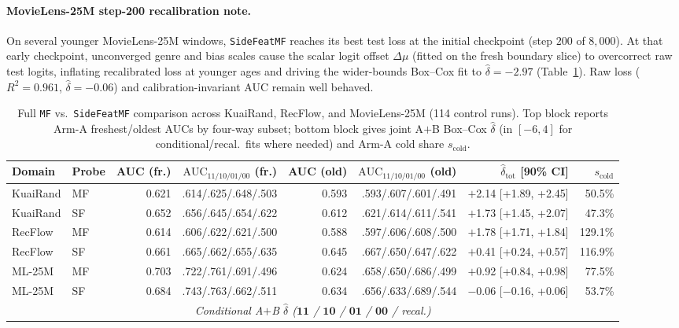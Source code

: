\documentclass[10pt,letterpaper]{article}
\begin{document}
{\sloppy
\paragraph{MovieLens-25M step-200 recalibration note.}
On several younger MovieLens-25M windows, \texttt{SideFeatMF} reaches its best
test loss at the initial checkpoint (step $200$ of $8{,}000$). At that early
checkpoint, unconverged genre and bias scales cause the scalar logit offset
$\Delta\mu$ (fitted on the fresh boundary slice) to overcorrect raw test logits,
inflating recalibrated loss at younger ages and driving the wider-bounds
Box--Cox fit to $\hat\delta = -2.97$ (Table~\ref{tab:sidefeat_full}). Raw loss
($R^2 = 0.961$, $\hat\delta = -0.06$) and calibration-invariant AUC remain well
behaved.\par}

\begin{table}[t]
\centering
\caption{Full \texttt{MF} vs.\ \texttt{SideFeatMF} comparison across KuaiRand,
RecFlow, and MovieLens-25M (114 control runs). Top block reports Arm-A
freshest/oldest AUCs by four-way subset; bottom block gives joint A${+}$B
Box--Cox $\hat\delta$ (in $[-6,4]$ for conditional/recal.\ fits where needed)
and Arm-A cold share $s_{\mathrm{cold}}$.}
\label{tab:sidefeat_full}
\scriptsize
\setlength{\tabcolsep}{2.4pt}
\begin{tabular}{llrrrrrr}
\toprule
Domain & Probe & AUC (fr.) & $\mathrm{AUC}_{11/10/01/00}$ (fr.) & AUC (old) & $\mathrm{AUC}_{11/10/01/00}$ (old) & $\hat\delta_{\mathrm{tot}}$ [90\% CI] & $s_{\mathrm{cold}}$ \\
\midrule
KuaiRand & MF & 0.621 & .614/.625/.648/.503 & 0.593 & .593/.607/.601/.491 & $+$2.14 [+1.89, +2.45] & 50.5\% \\
KuaiRand & SF & 0.652 & .656/.645/.654/.622 & 0.612 & .621/.614/.611/.541 & $+$1.73 [+1.45, +2.07] & 47.3\% \\
RecFlow  & MF & 0.614 & .606/.622/.621/.500 & 0.588 & .597/.606/.608/.500 & $+$1.78 [+1.71, +1.84] & 129.1\% \\
RecFlow  & SF & 0.661 & .665/.662/.655/.635 & 0.645 & .667/.650/.647/.622 & $+$0.41 [+0.24, +0.57] & 116.9\% \\
ML-25M   & MF & 0.703 & .722/.761/.691/.496 & 0.624 & .658/.650/.686/.499 & $+$0.92 [+0.84, +0.98] & 77.5\% \\
ML-25M   & SF & 0.684 & .743/.763/.662/.511 & 0.634 & .656/.633/.689/.544 & $-$0.06 [$-$0.16, +0.06] & 53.7\% \\
\midrule
\multicolumn{8}{c}{\emph{Conditional A${+}$B $\hat\delta$ ($\mathbf{11}$ / $\mathbf{10}$ / $\mathbf{01}$ / $\mathbf{00}$ / recal.)}} \\

\end{tabular}
\end{table}
\end{document}
